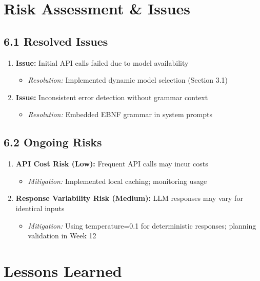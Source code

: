 \documentclass[a4paper,11pt]{article}
\begin{document}
\section{Risk Assessment \& Issues}

\subsection{6.1 Resolved Issues}

\begin{enumerate}
    \item \textbf{Issue:} Initial API calls failed due to model availability
    \begin{itemize}
        \item \textit{Resolution:} Implemented dynamic model selection (Section 3.1)
    \end{itemize}
    
    \item \textbf{Issue:} Inconsistent error detection without grammar context
    \begin{itemize}
        \item \textit{Resolution:} Embedded EBNF grammar in system prompts
    \end{itemize}
\end{enumerate}

\subsection{6.2 Ongoing Risks}

\begin{enumerate}
    \item \textbf{API Cost Risk (Low):} Frequent API calls may incur costs
    \begin{itemize}
        \item \textit{Mitigation:} Implemented local caching; monitoring usage
    \end{itemize}
    
    \item \textbf{Response Variability Risk (Medium):} LLM responses may vary for identical inputs
    \begin{itemize}
        \item \textit{Mitigation:} Using temperature=0.1 for deterministic responses; planning validation in Week 12
    \end{itemize}
\end{enumerate}

\section{Lessons Learned}
\end{document}
